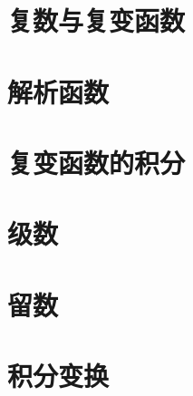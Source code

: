 \documentclass[12pt,xcolor={table},handout]{ctexbeamer}
\begin{document}


\part{复数与复变函数}








\part{解析函数}




\part{复变函数的积分}






\part{级数}





\part{留数}




\part{积分变换}




\end{document}
